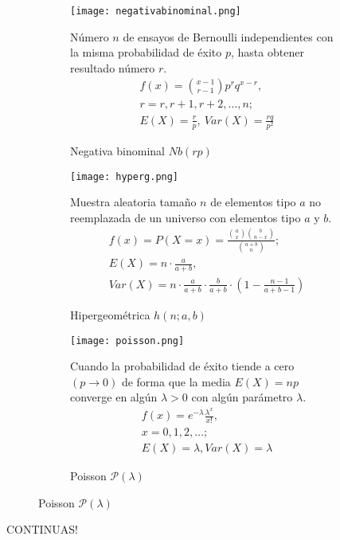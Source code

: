 \begin{figure}[H]	
	\begin{subfigure}[t]{.5\textwidth}
		\texttt{[image: negativabinominal.png]}\caption{Negativa binominal $Nb(rp)$}
		Número $n$ de ensayos de Bernoulli independientes con la misma probabilidad de éxito $p$, hasta obtener resultado número $r$.
		\begin{equation}
		\begin{matrix}
		f(x)=\binom{x-1}{r-1}p^rq^{x-r},\\
		r=r,r+1,r+2,\ldots,n;\\
		E(X)=\frac{r}{p},\ Var(X)=\frac{rq}{p^2}
		\end{matrix}
		\end{equation}
	\end{subfigure}\qquad
\begin{subfigure}[t]{.5\textwidth}
		\texttt{[image: hyperg.png]}\caption{Hipergeométrica $h(n;a,b)$}
		Muestra aleatoria tamaño $n$ de elementos tipo $a$ no reemplazada de un universo con elementos tipo $a$ y $b$.
		\begin{equation}
		\begin{matrix}
		f(x)=P(X=x)=\frac{\binom{a}{x}\binom{b}{n-x}}{\binom{a+b}{n}};\\
		E(X)=n\cdot\frac{a}{a+b},\\
		Var(X)=n\cdot\frac{a}{a+b}\cdot\frac{b}{a+b}\cdot(1-\frac{n-1}{a+b-1})
\end{matrix}
		\end{equation}
	\end{subfigure}\qquad
\begin{subfigure}[t]{.5\textwidth}
	\texttt{[image: poisson.png]}\caption{Poisson $\mathcal{P}(\lambda)$}
Cuando la probabilidad de éxito tiende a cero $(p\rightarrow0)$ de forma que la media $E(X)=np$ converge en algún $\lambda>0$ con algún parámetro $\lambda$.
	\begin{equation}
	\begin{matrix}
f(x)=e^{-\lambda}\frac{\lambda^x}{x!},\\
x=0,1,2,\ldots;\\
	E(X)=\lambda, Var(X)=\lambda
	\end{matrix}
	\end{equation}
\end{subfigure}
\end{figure}
CONTINUAS!
